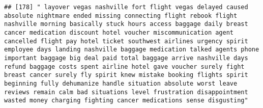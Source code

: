 \documentclass[
]{article}
\begin{document}
\begin{verbatim}
## [178] " layover vegas nashville fort flight vegas delayed caused absolute nightmare ended missing connecting flight rebook flight nashville morning basically stuck hours access baggage daily breast cancer medication discount hotel voucher miscommunication agent cancelled flight pay hotel ticket southwest airlines urgency spirit employee days landing nashville baggage medication talked agents phone important baggage big deal paid total baggage arrive nashville days refund baggage costs spent airline hotel gave voucher surely fight breast cancer surely fly spirit knew mistake booking flights spirit beginning fully dehumanize handle situation absolute worst leave reviews remain calm bad situations level frustration disappointment wasted money charging fighting cancer medications sense disgusting"                                                                                                                                                                                                                                                                                                                                                                                                                                                                                                                                                                                                                                                                                                                                                                                                                                                                                                                                                                  

\end{verbatim}
\end{document}

